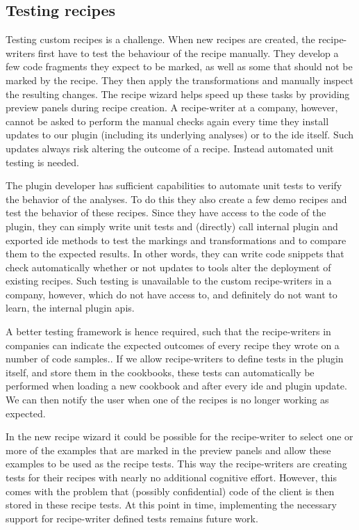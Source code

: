 \subsection{Testing recipes}
Testing custom recipes is a challenge.
When new recipes are created, the recipe-writers first have to test the behaviour of the recipe manually.
They develop a few code fragments they expect to be marked, as well as some that should not be marked by the recipe.
They then apply the transformations and manually inspect the resulting changes.
The recipe wizard helps speed up these tasks by providing preview panels during recipe creation.
A recipe-writer at a company, however, cannot be asked to perform the manual checks again every time they install updates to our plugin (including its underlying analyses) or to the \gls{ide} itself.
Such updates always risk altering the outcome of a recipe.
Instead automated unit testing is needed.

The plugin developer has sufficient capabilities to automate unit tests to verify the behavior of the analyses.
To do this they also create a few demo recipes and test the behavior of these recipes.
Since they have access to the code of the plugin, they can simply write unit tests and (directly) call internal plugin and exported \gls{ide} methods to test the markings and transformations and to compare them to the expected results.
In other words, they can write code snippets that check automatically whether or not updates to tools alter the deployment of existing recipes.
Such testing is unavailable to the custom recipe-writers in a company, however, which do not have access to, and definitely do not want to learn, the internal plugin \glspl{api}.  

A better testing framework is hence required, such that the recipe-writers in companies can indicate the expected outcomes of every recipe they wrote on a number of code samples.. 
If we allow recipe-writers to define tests in the plugin itself, and store them in the cookbooks, these tests can automatically be performed when loading a new cookbook and after every \gls{ide} and plugin update.
We can then notify the user when one of the recipes is no longer working as expected.

In the new recipe wizard it could be possible for the recipe-writer to select one or more of the examples that are marked in the preview panels and allow these examples to be used as the recipe tests.
This way the recipe-writers are creating tests for their recipes with nearly no additional cognitive effort.
However, this comes with the problem that (possibly confidential) code of the client is then stored in these recipe tests.
At this point in time, implementing the necessary support for recipe-writer defined tests remains future work.

